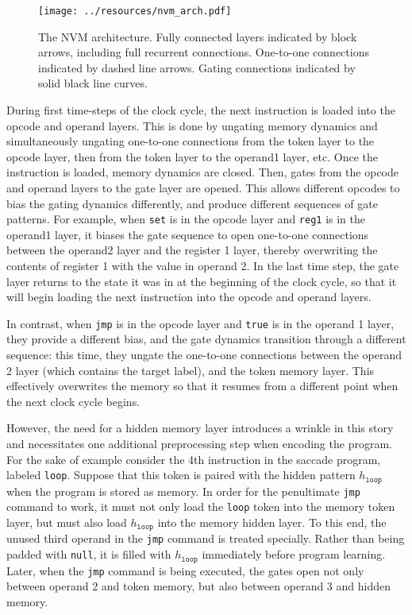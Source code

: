 \documentclass[pdftex,12pt,letterpaper]{article}
\begin{document}
\begin{figure}[H]
\centering
\texttt{[image: ../resources/nvm\_arch.pdf]}
\caption{The NVM architecture.  Fully connected layers indicated by block arrows, including full recurrent connections.  One-to-one connections indicated by dashed line arrows.  Gating connections indicated by solid black line curves.}
\label{fig:arch}
\end{figure}

During first time-steps of the clock cycle, the next instruction is loaded into the opcode and operand layers.  This is done by ungating memory dynamics and simultaneously ungating one-to-one connections from the token layer to the opcode layer, then from the token layer to the operand1 layer, etc.  Once the instruction is loaded, memory dynamics are closed.  Then, gates from the opcode and operand layers to the gate layer are opened.  This allows different opcodes to bias the gating dynamics differently, and produce different sequences of gate patterns.  For example, when \texttt{set} is in the opcode layer and \texttt{reg1} is in the operand1 layer, it biases the gate sequence to open one-to-one connections between the operand2 layer and the register 1 layer, thereby overwriting the contents of register 1 with the value in operand 2.  In the last time step, the gate layer returns to the state it was in at the beginning of the clock cycle, so that it will begin loading the next instruction into the opcode and operand layers.

In contrast, when \texttt{jmp} is in the opcode layer and \texttt{true} is in the operand 1 layer, they provide a different bias, and the gate dynamics transition through a different sequence:  this time, they ungate the one-to-one connections between the operand 2 layer (which contains the target label), and the token memory layer.  This effectively overwrites the memory so that it resumes from a different point when the next clock cycle begins.

However, the need for a hidden memory layer introduces a wrinkle in this story and necessitates one additional preprocessing step when encoding the program.  For the sake of example consider the 4th instruction in the saccade program, labeled \texttt{loop}.  Suppose that this token is paired with the hidden pattern \texttt{$h_\texttt{loop}$} when the program is stored as memory.  In order for the penultimate \texttt{jmp} command to work, it must not only load the \texttt{loop} token into the memory token layer, but must also load \texttt{$h_\texttt{loop}$} into the memory hidden layer.  To this end, the unused third operand in the \texttt{jmp} command is treated specially.  Rather than being padded with \texttt{null}, it is filled with \texttt{$h_\texttt{loop}$} immediately before program learning.  Later, when the \texttt{jmp} command is being executed, the gates open not only between operand 2 and token memory, but also between operand 3 and hidden memory.
\end{document}
